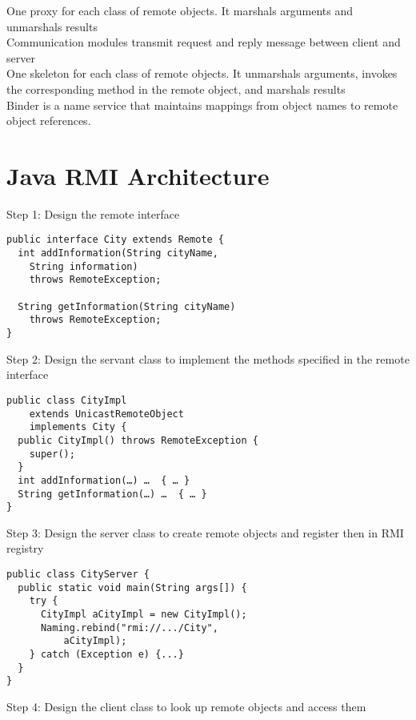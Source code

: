 \begin{multicols*}{2}
\noindent One proxy for each class of remote objects. It marshals arguments and unmarshals results\\

\noindent Communication modules transmit request and reply message between client and server\\

\noindent One skeleton for each class of remote objects. It unmarshals arguments, invokes the corresponding method in the remote object, and marshals results\\

\noindent Binder is a name service that maintains mappings from object names to remote object references.

\section{Java RMI Architecture}

\noindent Step 1: Design the remote interface

\begin{verbatim}
public interface City extends Remote {
  int addInformation(String cityName, 
    String information)
    throws RemoteException;

  String getInformation(String cityName)
    throws RemoteException;
}
\end{verbatim}

\noindent Step 2: Design the servant class to implement the methods specified in the remote interface

\begin{verbatim}
public class CityImpl
    extends UnicastRemoteObject
    implements City {
  public CityImpl() throws RemoteException {
    super();
  }
  int addInformation(…) …  { … }
  String getInformation(…) …  { … }
}
\end{verbatim}

\noindent Step 3: Design the server class to create remote objects and register then in RMI registry

\begin{verbatim}
public class CityServer {
  public static void main(String args[]) {
    try {
      CityImpl aCityImpl = new CityImpl();
      Naming.rebind("rmi://.../City", 
          aCityImpl);
    } catch (Exception e) {...}
  }
}
\end{verbatim}

\noindent Step 4: Design the client  class to look up remote objects and access them


\end{multicols*}
